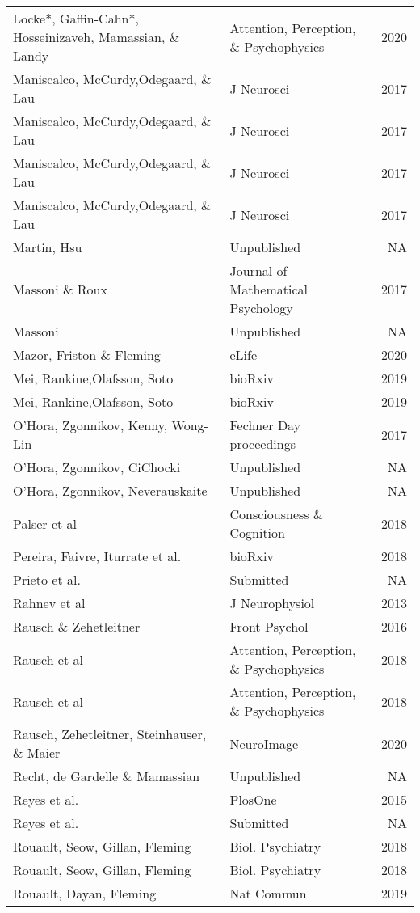 \documentclass[
]{article}
\begin{document}
\begin{longtable}[t]{llr}
Locke*, Gaffin-Cahn*, Hosseinizaveh, Mamassian, \& Landy & Attention, Perception, \& Psychophysics & 2020\\
\addlinespace
Maniscalco, McCurdy,Odegaard, \& Lau & J Neurosci & 2017\\
Maniscalco, McCurdy,Odegaard, \& Lau & J Neurosci & 2017\\
Maniscalco, McCurdy,Odegaard, \& Lau & J Neurosci & 2017\\
Maniscalco, McCurdy,Odegaard, \& Lau & J Neurosci & 2017\\
Martin, Hsu & Unpublished & NA\\
\addlinespace
Massoni \& Roux & Journal of Mathematical Psychology & 2017\\
Massoni & Unpublished & NA\\
Mazor, Friston \& Fleming & eLife & 2020\\
Mei, Rankine,Olafsson, Soto & bioRxiv & 2019\\
Mei, Rankine,Olafsson, Soto & bioRxiv & 2019\\
\addlinespace
O'Hora, Zgonnikov, Kenny, Wong-Lin & Fechner Day proceedings & 2017\\
O'Hora, Zgonnikov, CiChocki & Unpublished & NA\\
O'Hora, Zgonnikov, Neverauskaite & Unpublished & NA\\
Palser et al & Consciousness \& Cognition & 2018\\
Pereira, Faivre, Iturrate et al. & bioRxiv & 2018\\
\addlinespace
Prieto et al. & Submitted & NA\\
Rahnev et al & J Neurophysiol & 2013\\
Rausch \& Zehetleitner & Front Psychol & 2016\\
Rausch et al & Attention, Perception, \& Psychophysics & 2018\\
Rausch et al & Attention, Perception, \& Psychophysics & 2018\\
\addlinespace
Rausch, Zehetleitner, Steinhauser, \& Maier & NeuroImage & 2020\\
Recht, de Gardelle \& Mamassian & Unpublished & NA\\
Reyes et al. & PlosOne & 2015\\
Reyes et al. & Submitted & NA\\
Rouault, Seow, Gillan, Fleming & Biol. Psychiatry & 2018\\
\addlinespace
Rouault, Seow, Gillan, Fleming & Biol. Psychiatry & 2018\\
Rouault, Dayan, Fleming & Nat Commun & 2019\\

\end{longtable}
\end{document}
